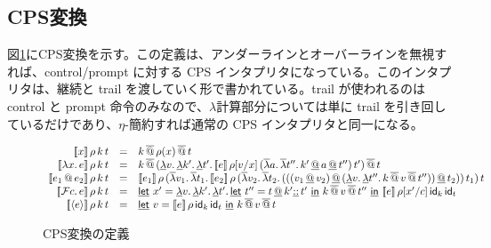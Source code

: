 \subsection{CPS変換}
図\ref{CPSTrans}にCPS変換を示す。この定義は、アンダーラインとオーバーラインを無視すれば、control/prompt に対する CPS インタプリタになっている。このインタプリタは、継続と trail を渡していく形で書かれている。trail が使われるのは control と prompt 命令のみなので、$\lambda$計算部分については単に trail を引き回しているだけであり、$\eta$-簡約すれば通常の CPS インタプリタと同一になる。
\begin{figure}[h]
\[
\begin{array}{rcl}
  \CPS{x}{\rho}{k}{t} & = & \SApp{\SApp{k}{\rho(x)}}{t}\\
  
  \CPS{\Lam{x}{e}}{\rho}{k}{t} & = & 
      {\SApp{\SApp{k}
                  {\DLamP{v}{\DLam{k'}{\DLam{t'}
                    {\CPS{e}{\rho[\Change{x}{v}]}
           {\SLamP{a}{\SLam{t''}
                 {\DApp{\DApp{k'}{a}}{t''}}}}
                  {t'}}}}}}
        {t}}\\
                  
  \CPS{\App{e_1}{e_2}}{\rho}{k}{t} & = & \CPS{e_1}{\rho}
      {\SLamP{v_1}{\SLam{t_1}{\CPS{e_2}{\rho}
            {\SLamP{v_2}{\SLam{t_2}
                {\DAppP{\DAppP{\DAppP{v_1}{v_2}}
                    {\DLamP{v}{\DLam{t''}
                        {\SApp{\SApp{k}{v}}{t''}}}}}{t_2}}}}{t_1}}}}{t}\\
  
  
  \CPS{\Control{c}{e}}{\rho}{k}{t} & = & \DLet{x'}
      {\DLam{v}{\DLam{k'}{\DLam{t'}
        {\DLet{t''}{\DAppend{t}{\DCons{k'}{t'}}}{\SApp{\SApp{k}{v}}{t''}}}}}}
      {\CPS{e}{\rho[\Change{c}{x'}]}{\Idk}{\Idt}}\\
      
  \CPS{\Prompt{e}}{\rho}{k}{t} & = &
      \DLet{v}{\CPS{e}{\rho}{\Idk}{\Idt}}{\SApp{\SApp{k}{v}}{t}}\\

\end{array}
\]
\caption{CPS変換の定義}
\label{CPSTrans}
\end{figure}

